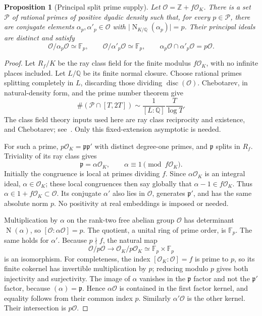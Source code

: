\documentclass[11pt]{article}
\numberwithin{equation}{section}
\newtheorem{proposition}[theorem]{Proposition}
\theoremstyle{definition}\newtheorem{definition}[theorem]{Definition}
\theoremstyle{remark}\newtheorem{remark}[theorem]{Remark}
\newcommand{\Z}{\mathbb Z}\newcommand{\Q}{\mathbb Q}\newcommand{\R}{\mathbb R}
\newcommand{\F}{\mathbb F}\newcommand{\C}{\mathbb C}
\newcommand{\OO}{\mathcal O}\newcommand{\PP}{\mathcal P}
\newcommand{\abs}[1]{\lvert #1\rvert}
\newcommand{\N}{\operatorname{N}}
\newcommand{\disc}{\operatorname{disc}}
\begin{document}
\begin{proposition}[Principal split prime supply]\label{prop:supply}
Let $\OO=\Z+f\OO_K$. There is a set $\PP$ of rational primes of positive dyadic density such that, for every $p\in\PP$, there are conjugate elements $\alpha_p,\alpha'_p\in\OO$ with $\abs{\N_{K/\Q}(\alpha_p)}=p$. Their principal ideals are distinct and satisfy
\[
 \OO/\alpha_p\OO\simeq\F_p,\qquad
 \OO/\alpha'_p\OO\simeq\F_p,\qquad
 \alpha_p\OO\cap\alpha'_p\OO=p\OO.
\]
\end{proposition}
\begin{proof}
Let $R_f/K$ be the ray class field for the finite modulus $f\OO_K$, with no infinite places included. Let $L/\Q$ be its finite normal closure. Choose rational primes splitting completely in $L$, discarding those dividing $\disc(\OO)$. Chebotarev, in natural-density form, and the prime number theorem give
\begin{equation}\label{eq:raydensity}
 \#(\PP\cap[T,2T])\sim\frac1{[L:\Q]}\frac T{\log T}.
\end{equation}
The class field theory inputs used here are ray class reciprocity and existence, and Chebotarev; see~\cite[Chapter V, Theorems 3.5, 3.6, 3.23 and Remark 3.26(d)]{milne}. Only this fixed-extension asymptotic is needed.

For such a prime, $p\OO_K=\mathfrak p\mathfrak p'$ with distinct degree-one primes, and $\mathfrak p$ splits in $R_f$. Triviality of its ray class gives
\[
 \mathfrak p=\alpha\OO_K,
 \qquad \alpha\equiv1\pmod{f\OO_K}.
\]
Initially the congruence is local at primes dividing $f$. Since $\alpha\OO_K$ is an integral ideal, $\alpha\in\OO_K$; these local congruences then say globally that $\alpha-1\in f\OO_K$. Thus $\alpha\in1+f\OO_K\subset\OO$. Its conjugate $\alpha'$ also lies in $\OO$, generates $\mathfrak p'$, and has the same absolute norm $p$. No positivity at real embeddings is imposed or needed.

Multiplication by $\alpha$ on the rank-two free abelian group $\OO$ has determinant $\N(\alpha)$, so $[\OO:\alpha\OO]=p$. The quotient, a unital ring of prime order, is $\F_p$. The same holds for $\alpha'$. Because $p\nmid f$, the natural map
\[
 \OO/p\OO\longrightarrow\OO_K/p\OO_K\simeq\F_p\times\F_p
\]
is an isomorphism. For completeness, the index $[\OO_K:\OO]=f$ is prime to $p$, so its finite cokernel has invertible multiplication by $p$; reducing modulo $p$ gives both injectivity and surjectivity. The image of $\alpha$ vanishes in the $\mathfrak p$ factor and not the $\mathfrak p'$ factor, because $(\alpha)=\mathfrak p$. Hence $\alpha\OO$ is contained in the first factor kernel, and equality follows from their common index $p$. Similarly $\alpha'\OO$ is the other kernel. Their intersection is $p\OO$.
\end{proof}
\end{document}
